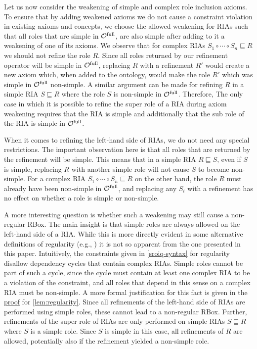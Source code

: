 Let us now consider the weakening of simple and complex role inclusion axioms. To ensure that by adding weakened axioms we do not cause a constraint violation in existing axioms and concepts, we choose the allowed weakening for RIAs such that all roles that are simple in ${\mathcal{O}^\textnormal{full}}$, are also simple after adding to it a weakening of one of its axioms. We observe that for complex RIAs $S_1 \circ \cdots \circ S_n \sqsubseteq R$ we should not refine the role $R$. Since all roles returned by our refinement operator will be simple in ${\mathcal{O}^\textnormal{full}}$, replacing $R$ with a refinement $R'$ would create a new axiom which, when added to the ontology, would make the role $R'$ which was simple in ${\mathcal{O}^\textnormal{full}}$ non-simple. A similar argument can be made for refining $R$ in a simple RIA $S \sqsubseteq R$ where the role $S$ is non-simple in ${\mathcal{O}^\textnormal{full}}$. Therefore, The only case in which it is possible to refine the super role of a RIA during axiom weakening requires that the RIA is simple and additionally that the sub role of the RIA is simple in ${\mathcal{O}^\textnormal{full}}$.

When it comes to refining the left-hand side of RIAs, we do not need any special restrictions. The important observation here is that all roles that are returned by the refinement will be simple. This means that in a simple RIA $R \sqsubseteq S$, even if $S$ is simple, replacing $R$ with another simple role will not cause $S$ to become non-simple. For a complex RIA $S_1 \circ \cdots \circ S_n \sqsubseteq R$ on the other hand, the role $R$ must already have been non-simple in ${\mathcal{O}^\textnormal{full}}$, and replacing any $S_i$ with a refinement has no effect on whether a role is simple or non-simple.

A more interesting question is whether such a weakening may still cause a non-regular RBox. The main insight is that simple roles are always allowed on the left-hand side of a RIA. While this is more directly evident in some alternative definitions of regularity (e.g., \cite{rudolph2011foundations}) it is not so apparent from the one presented in this paper. Intuitively, the constraints given in \cref{sroiq-syntax} for regularity disallow dependency cycles that contain complex RIAs. Simple roles cannot be part of such a cycle, since the cycle must contain at least one complex RIA to be a violation of the constraint, and all roles that depend in this sense on a complex RIA must be non-simple. A more formal justification for this fact is given in the \hyperref[proof:regularity]{proof} for \cref{lem:regularity}. Since all refinements of the left-hand side of RIAs are performed using simple roles, these cannot lead to a non-regular RBox. Further, refinements of the super role of RIAs are only performed on simple RIAs $S \sqsubseteq R$ where $S$ is a simple role. Since $S$ is simple in this case, all refinements of $R$ are allowed, potentially also if the refinement yielded a non-simple role.

